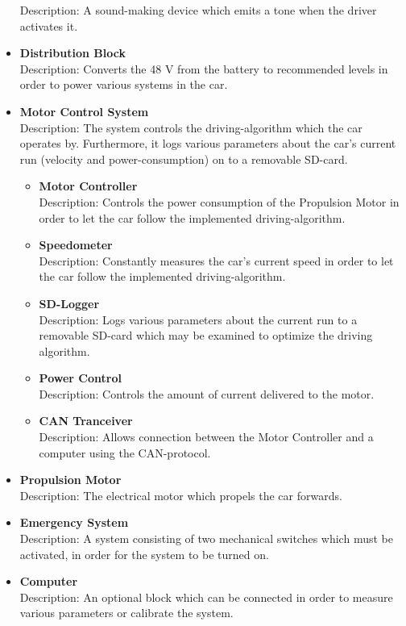 \begin{itemize}
	Description: A sound-making device which emits a tone when the driver activates it.
	\item \textbf{Distribution Block}\\ 
	Description: Converts the 48 V from the battery to recommended levels in order to power various systems in the car.
	\item \textbf{Motor Control System}\\
	Description: The system controls the driving-algorithm which the car operates by. Furthermore, it logs various parameters about the car's current run (velocity and power-consumption) on to a removable SD-card.
	\begin{itemize}
		\item \textbf{Motor Controller}\\
		Description: Controls the power consumption of the Propulsion Motor in order to let the car follow the implemented driving-algorithm. 
		\item \textbf{Speedometer}\\
		Description: Constantly measures the car's current speed in order to let the car follow the implemented driving-algorithm.
		\item \textbf{SD-Logger}\\
		Description: Logs various parameters about the current run to a removable SD-card which may be examined to optimize the driving algorithm.
		\item \textbf{Power Control}\\
		Description: Controls the amount of current delivered to the motor.
		\item \textbf{CAN Tranceiver}\\
		Description: Allows connection between the Motor Controller and a computer using the CAN-protocol.
	\end{itemize}
	\item \textbf{Propulsion Motor}\\
	Description: The electrical motor which propels the car forwards.
	\item \textbf{Emergency System}\\
	Description: A system  consisting of two mechanical switches  which must be activated, in order for the system to be turned on.
	\item \textbf{Computer}\\
	Description: An optional block which can be connected in order to measure various parameters or calibrate the system.
\end{itemize}